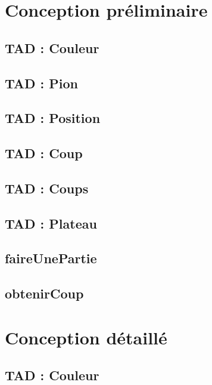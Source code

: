 \documentclass{article}
\begin{document}
\section{Conception préliminaire}

\subsection{TAD : Couleur}


\subsection{TAD : Pion}


\subsection{TAD : Position}


\subsection{TAD : Coup}


\subsection{TAD : Coups}


\subsection{TAD : Plateau}


\subsection{faireUnePartie}


\subsection{obtenirCoup}




\section{Conception détaillé}
\subsection{TAD : Couleur}

\end{document}
